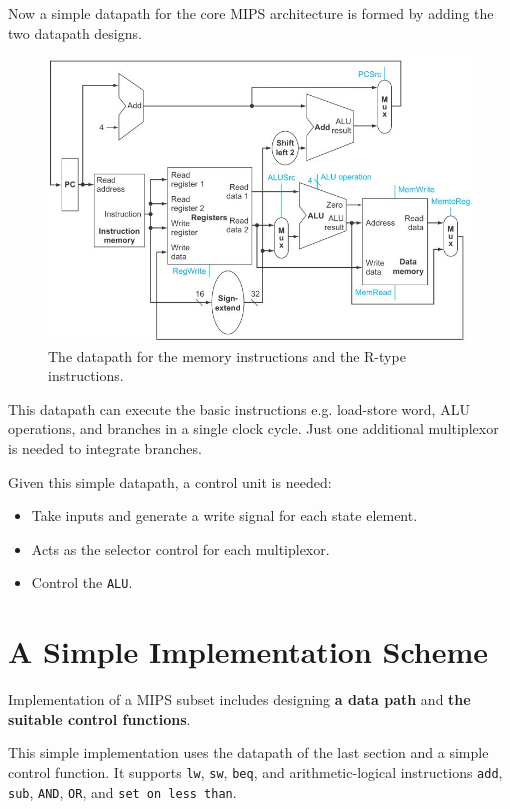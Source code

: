 \documentclass[10pt,a4paper]{article}
\begin{document}
Now a simple datapath for the core MIPS architecture is formed by adding the two datapath designs. \par
\begin{figure} [h!]
    \centering
    \includegraphics[scale=0.75]{Core datapath.JPG}
    \caption{The datapath for the memory instructions and the R-type instructions.}
\end{figure}
This datapath can execute the basic instructions e.g. load-store word, ALU operations, and branches
in a single clock cycle. Just one additional multiplexor is needed to integrate branches.

Given this simple datapath, a control unit is needed:
\begin{itemize}
    \item Take inputs and generate a write signal for each state element.
    \item Acts as the selector control for each multiplexor.
    \item Control the \texttt{ALU}.
\end{itemize} 

\pagebreak
\section{A Simple Implementation Scheme}

Implementation of a MIPS subset includes designing \textbf{a data path} and \textbf{the suitable control
functions}. 

This simple implementation uses the datapath of the last section and a simple control function. It
supports \texttt{lw}, \texttt{sw}, \texttt{beq}, and arithmetic-logical instructions \texttt{add},
\texttt{sub}, \texttt{AND}, \texttt{OR}, and \texttt{set on less than}. 
\end{document}
